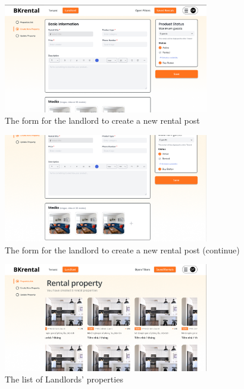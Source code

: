 \begin{figure}[ht]
    \centering
    \includegraphics[width=0.8\textwidth]{Images/Mockup/create_rental_1.png}
    \caption{The form for the landlord to create a new rental post}
    \label{fig:create-rental-1}
\end{figure}

\begin{figure}[ht]
    \centering
    \includegraphics[width=0.8\textwidth]{Images/Mockup/create_rental_2.png}
    \caption{The form for the landlord to create a new rental post (continue)}
    \label{fig:create-rental-2}
\end{figure}

\clearpage

\begin{figure}[ht]
    \centering
    \includegraphics[width=0.8\textwidth]{Images/Mockup/property_list.png}
    \caption{The list of Landlords' properties}
    \label{fig:property_list}
\end{figure}

